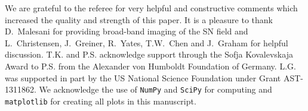 \documentclass[traditabstract]{aa}
\begin{document}
\begin{acknowledgements}

We are grateful to the referee for very helpful and constructive comments which increased the quality and strength of this paper. It is a pleasure to thank D.~Malesani for providing broad-band imaging of the SN field and L.~Christensen, J.~Greiner, R.~Yates, T.W.~Chen and J.~Graham for helpful discussion. T.K. and P.S. acknowledge support through the Sofja Kovalevskaja Award to P.S. from the Alexander von Humboldt Foundation of Germany. L.G. was supported in part by the US National Science Foundation under Grant AST-1311862. We acknowledge the use of \texttt{NumPy} and \texttt{SciPy} \citep{Walt:2011:NAS:1957373.1957466} for computing and \texttt{matplotlib} \citep{Hunter:2007} for creating all plots in this manuscript. 

\end{acknowledgements}



\end{document}
